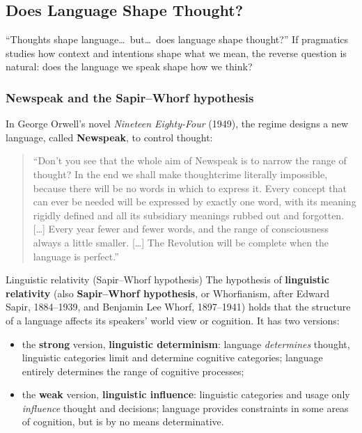 \subsection{Does Language Shape Thought?}
\label{sec:language-and-thought}

``Thoughts shape language\ldots\ but\ldots\ does language shape thought?'' If pragmatics
studies how context and intentions shape what we mean, the reverse question is natural:
does the language we speak shape how we think?

\subsubsection{Newspeak and the Sapir--Whorf hypothesis}

In George Orwell's novel \emph{Nineteen Eighty-Four} (1949), the regime designs a new
language, called \textbf{Newspeak}, to control thought:

\begin{quote}\small
``Don't you see that the whole aim of Newspeak is to narrow the range of thought? In the
end we shall make thought\-crime literally impossible, because there will be no words in
which to express it. Every concept that can ever be needed will be expressed by exactly
one word, with its meaning rigidly defined and all its subsidiary meanings rubbed out and
forgotten. [\ldots] Every year fewer and fewer words, and the range of consciousness
always a little smaller. [\ldots] The Revolution will be complete when the language is
perfect.''
\end{quote}

\begin{nbdef}{Linguistic relativity (Sapir--Whorf hypothesis)}
The hypothesis of \textbf{linguistic relativity} (also \textbf{Sapir--Whorf
hypothesis}, or Whorfianism, after Edward Sapir, 1884--1939, and Benjamin Lee Whorf,
1897--1941) holds that the structure of a language affects its speakers' world view or
cognition. It has two versions:
\begin{itemize}[nosep]
  \item the \textbf{strong} version, \textbf{linguistic determinism}: language
        \emph{determines} thought, linguistic categories limit and determine cognitive
        categories; language entirely determines the range of cognitive processes;
  \item the \textbf{weak} version, \textbf{linguistic influence}: linguistic categories
        and usage only \emph{influence} thought and decisions; language provides
        constraints in some areas of cognition, but is by no means determinative.
\end{itemize}
\end{nbdef}

